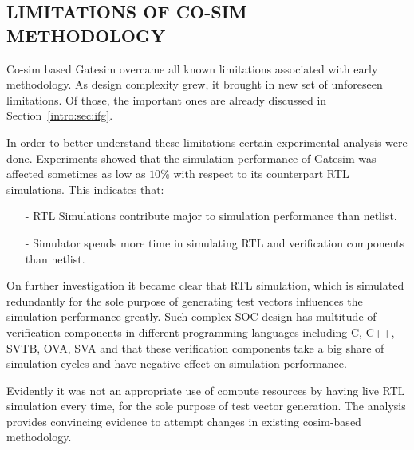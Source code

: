\subsection {LIMITATIONS OF CO-SIM METHODOLOGY}

Co-sim based Gatesim overcame all known limitations associated with early methodology. As design complexity grew, it brought in new set of unforeseen limitations. Of those, the important ones are already discussed in Section~\ref{intro:sec:ifg}.

In order to better understand these limitations certain experimental analysis were done. Experiments showed that the simulation performance of Gatesim was affected sometimes as low as $10\%$ with respect to its counterpart RTL simulations. This indicates that:

\begin{itemize}
	\item[-]RTL Simulations contribute major to simulation performance than netlist.
	\item[-]Simulator spends more time in simulating RTL and verification components than netlist.
\end{itemize}

On further investigation it became clear that RTL simulation, which is simulated redundantly for the sole purpose of generating test vectors influences the simulation performance greatly. Such complex SOC design has multitude of verification components in different programming languages including C, C++, SVTB, OVA, SVA and that these verification components take a big share of simulation cycles and have negative effect on simulation performance.

Evidently it was not an appropriate use of compute resources by having live RTL simulation every time, for the sole purpose of test vector generation. The analysis provides convincing evidence to attempt changes in existing cosim-based methodology.

